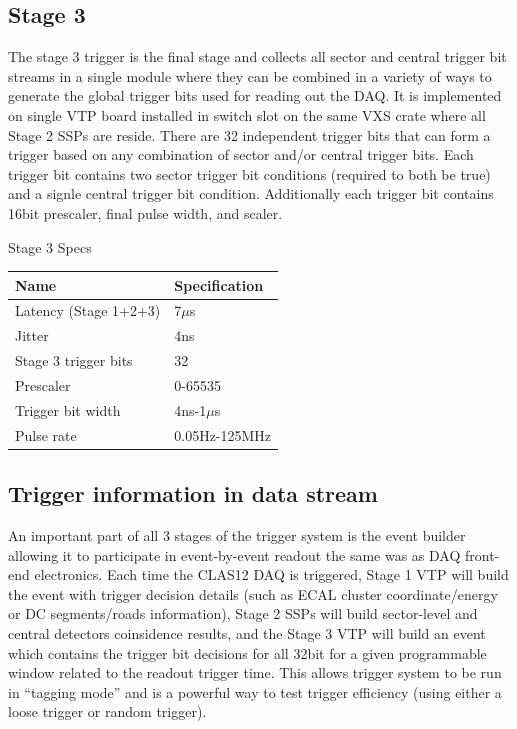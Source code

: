 \subsection{Stage 3}

The stage 3 trigger is the final stage and collects all sector and central trigger bit streams in a single module where they can be combined in a variety of ways to generate the global trigger bits used for reading out the DAQ. It is implemented on single VTP board installed in switch slot on the same VXS crate where all Stage 2 SSPs are reside. There are 32 independent trigger bits that can form a trigger based on any combination of sector and/or central trigger bits. Each trigger bit contains two sector trigger bit conditions (required to both be true) and a signle central trigger bit condition. Additionally each trigger bit contains 16bit prescaler, final pulse width, and scaler.

\begin{center}
	Stage 3 Specs\\
	\begin{tabular}{| l | l |}
		\hline \hline
		Name				& Specification	\\
		\hline
		Latency (Stage 1+2+3)		& 7$\mu$s	\\
		Jitter				& 4ns		\\
		Stage 3 trigger bits		& 32		\\
		Prescaler			& 0-65535	\\
		Trigger bit width		& 4ns-1$\mu$s	\\
		Pulse rate			& 0.05Hz-125MHz	\\
		\hline \hline
	\end{tabular}
\end{center}


\subsection{Trigger information in data stream}

An important part of all 3 stages of the trigger system is the event builder allowing it to participate in event-by-event readout the same was as DAQ front-end electronics. Each time the CLAS12 DAQ is triggered, Stage 1 VTP will build the event with trigger decision details (such as ECAL cluster coordinate/energy or DC segments/roads information), Stage 2 SSPs will build sector-level and central detectors coinsidence results, and the Stage 3 VTP will build an event which contains the trigger bit decisions for all 32bit for a given programmable window related to the readout trigger time. This allows trigger system to be run in ``tagging mode'' and is a powerful way to test trigger efficiency (using either a loose trigger or random trigger).
